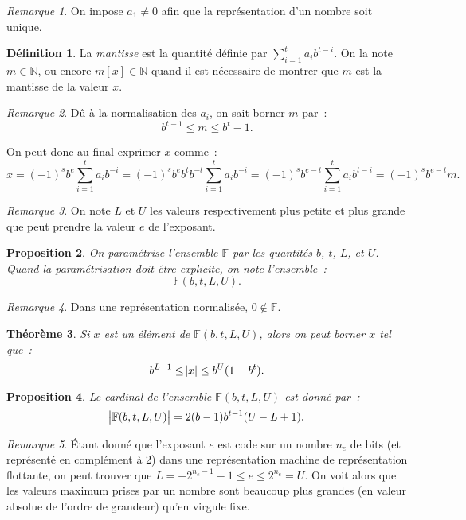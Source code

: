\documentclass{article}
\newtheorem{thm}{Théorème}[section]
\newtheorem{prp}[thm]{Proposition}
\theoremstyle{definition}
\newtheorem{déf}[thm]{Définition}
\theoremstyle{remark}
\newtheorem*{rmq}{Remarque}
\newcommand{\F}{\mathbb F}
\newcommand{\N}{\mathbb N}
\begin{document}
		\begin{rmq} On impose $a_1 \neq 0$ afin que la représentation d'un nombre soit unique. \end{rmq}

		\begin{déf} La \emph{mantisse} est la quantité définie par $\sum_{i=1}^ta_ib^{t-i}$. On la note $m \in \N$, ou encore $m[x] \in \N$ quand il est
		nécessaire de montrer que $m$ est la mantisse de la valeur $x$.
		\end{déf}

		\begin{rmq} Dû à la normalisation des $a_i$, on sait borner $m$ par~:
		\[b^{t-1} \leq m \leq b^t - 1.\]
		\end{rmq}

		On peut donc au final exprimer $x$ comme~:
		\[x = (-1)^sb^e\sum_{i=1}^ta_ib^{-i} = (-1)^sb^eb^tb^{-t}\sum_{i=1}^ta_ib^{-i} = (-1)^sb^{e-t}\sum_{i=1}^ta_ib^{t-i} = (-1)^sb^{e-t}m.\]

		\begin{rmq} On note $L$ et $U$ les valeurs respectivement plus petite et plus grande que peut prendre la valeur $e$ de l'exposant. \end{rmq}

		\begin{prp} On paramétrise l'ensemble $\F$ par les quantités $b$, $t$, $L$, et $U$. Quand la paramétrisation doit être explicite, on note l'ensemble~:
		\[\F(b, t, L, U).\]
		\end{prp}

		\begin{rmq} Dans une représentation normalisée, $0 \not \in \F$. \end{rmq}

		\begin{thm} Si $x$ est un élément de $\F(b, t, L, U)$, alors on peut borner $x$ tel que~:
		\[b^{L-1} \leq \abs x \leq b^U(1-b^t).\]
		\end{thm}

		\begin{prp} Le cardinal de l'ensemble $\F(b, t, L, U)$ est donné par~:
		\[\abs {\F(b, t, L, U)} = 2(b-1)b^{t-1}(U-L+1).\]
		\end{prp}

		\begin{rmq} Étant donné que l'exposant $e$ est code sur un nombre $n_e$ de bits (et représenté en complément à 2) dans une représentation machine de
		représentation flottante, on peut trouver que $L = -2^{n_e-1}-1 \leq e \leq 2^{n_e} = U$. On voit alors que les valeurs maximum prises par un nombre
		sont beaucoup plus grandes (en valeur absolue de l'ordre de grandeur) qu'en virgule fixe.
		\end{rmq}
\end{document}
